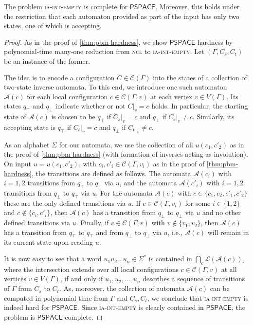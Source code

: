 \documentclass[anonymous,letter,UKenglish,cleveref,autoref,thm-restate]{lipics-v2021}
\newcommand{\PSPACE}{\ensuremath{\mathsf{PSPACE}}\xspace}
\newcommand{\cA}{\mathcal{A}}
\newcommand{\cL}{\mathcal{L}}
\newcommand{\cC}{\mathcal{C}}
\theoremstyle{plain}
\theoremstyle{plain}
\newcommand{\prob}[1]{\textup{\textsc{#1}}\xspace}
\newcommand{\dNCL}{\prob{ncl}}
\newcommand{\dIEmpty}[1]{\prob{{#1}-int-empty}}
\begin{document}
\begin{theorem}\label{thm:ia-hardness}
  The problem \dIEmpty{ia} is complete for \PSPACE{}.
  Moreover, this holds under the restriction that each automaton provided as part of the input has only two states, one of which is accepting.
\end{theorem}
\begin{proof}
  As in the proof of \cref{thm:pbm-hardness}, we show \PSPACE{}-hardness by polynomial-time many-one reduction from \dNCL{} to \dIEmpty{ia}.
  Let $(\Gamma, C_s, C_t)$ be an instance of the former.

  The idea is to encode a configuration $C \in \cC(\Gamma)$ into the states of a collection of two-state inverse automata.
  To this end, we introduce one such automaton $\mathcal{A}(c)$ for each local configuration $c \in \cC(\Gamma, v)$ at each vertex $v \in V(\Gamma)$.
  Its states $q_{\top}$ and $q_{\bot}$ indicate whether or not $C \vert_v = c$ holds.
  In particular, the starting state of $\cA(c)$ is chosen to be $q_{\top}$ if $C_s \vert_v = c$ and $q_{\bot}$ if $C_s \vert_v \neq c$.
  Similarly, its accepting state is $q_\top$ if $C_t \vert_v = c$ and $q_\bot$ if $C_t \vert_v \neq c$.

  As an alphabet $\Sigma$ for our automata, we use the collection of all $u(c_1, c'_2)$ as in the proof of \cref{thm:pbm-hardness} (with formation of inverses acting as involution).
  On input $u = u(c_1, c'_2)$, with $c_i, c'_i \in \cC(\Gamma, v_i)$ as in the proof of \cref{thm:pbm-hardness}, the transitions are defined as follows.
  The automata $\cA(c_i)$ with $i = 1,2$ transitions from $q_\top$ to $q_\bot$ via $u$, and the automata $\cA(c'_i)$ with $i = 1,2$ transitions from $q_\bot$ to $q_\top$ via $u$.
  For the automata $\cA(c)$ with $c \in \{ c_1,c_2, c'_1,c'_2\}$ these are the only defined transitions via $u$.
  If $c \in \cC(\Gamma, v_i)$ for some $i \in \{1,2\}$ and $c \not\in \{c_i, c'_i\}$, then $\cA(c)$ has a transition from $q_\bot$ to $q_\bot$ via $u$ and no other defined transitions via $u$.
  Finally, if $c \in \cC(\Gamma, v)$ with $v \not \in \{ v_1, v_2 \}$, then $\cA(c)$ has a transition from $q_\top$ to $q_\top$ and from $q_\bot$ to $q_\bot$ via $u$, i.e., $\cA(c)$ will remain in its current state upon reading $u$.

  It is now easy to see that a word $u_1u_2 \dotsc u_n \in \Sigma^\ast$ is contained in $\bigcap_c \cL(\cA(c))$, where the intersection extends over all local configurations $c \in \cC(\Gamma, v)$ at all vertices $v \in V(\Gamma)$, if and only if $u_1, u_2, \dotsc, u_n$ describes a sequence of transitions of $\Gamma$ from $C_s$ to $C_t$.
  As, moreover, the collection of automata $\cA(c)$ can be computed in polynomial time from $\Gamma$ and $C_s, C_t$, we conclude that \dIEmpty{ia} is indeed hard for \PSPACE.
  Since \dIEmpty{ia} is clearly contained in \PSPACE, the problem is \PSPACE-complete.
\end{proof}
\end{document}
